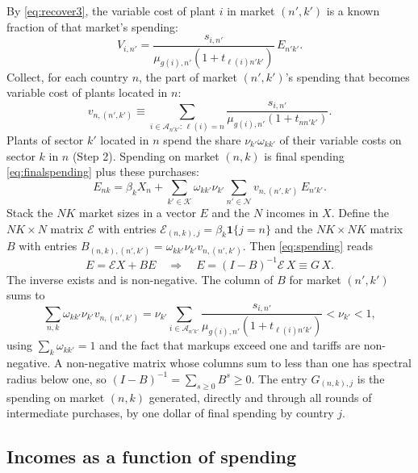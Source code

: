 \documentclass[11pt]{article}
\theoremstyle{remark}
\newcommand{\cN}{\mathcal N}
\newcommand{\cK}{\mathcal K}
\newcommand{\cA}{\mathcal A}
\begin{document}
By \eqref{eq:recover3}, the variable cost of plant $i$ in market $(n',k')$ is a known
fraction of that market's spending:
\[
  V_{i,n'}=\frac{s_{i,n'}}{\mu_{g(i),n'}(1+t_{\ell(i)n'k'})}\,E_{n'k'} .
\]
Collect, for each country $n$, the part of market $(n',k')$'s spending that becomes
variable cost of plants located in $n$:
\begin{equation}
  v_{n,(n',k')}\equiv\sum_{i\in\cA_{n'k'}:\,\ell(i)=n}
  \frac{s_{i,n'}}{\mu_{g(i),n'}(1+t_{nn'k'})} .
  \label{eq:vcoef}
\end{equation}
Plants of sector $k'$ located in $n$ spend the share $\nu_{k'}\omega_{kk'}$ of their
variable costs on sector $k$ in $n$ (Step 2). Spending on market $(n,k)$ is final
spending \eqref{eq:finalspending} plus these purchases:
\begin{equation}
  E_{nk}=\beta_kX_n+\sum_{k'\in\cK}\omega_{kk'}\nu_{k'}
  \sum_{n'\in\cN}v_{n,(n',k')}\,E_{n'k'} .
  \label{eq:spending}
\end{equation}
Stack the $NK$ market sizes in a vector $E$ and the $N$ incomes in $X$. Define the
$NK\times N$ matrix $\mathcal E$ with entries $\mathcal E_{(n,k),j}=\beta_k\mathbf
1\{j=n\}$ and the $NK\times NK$ matrix $B$ with entries
$B_{(n,k),(n',k')}=\omega_{kk'}\nu_{k'}v_{n,(n',k')}$. Then
\eqref{eq:spending} reads
\begin{equation}
  E=\mathcal EX+BE
  \quad\Longrightarrow\quad
  E=(I-B)^{-1}\mathcal E\,X\equiv G\,X .
  \label{eq:EofX}
\end{equation}
The inverse exists and is non-negative. The column of $B$ for market $(n',k')$ sums to
\[
  \sum_{n,k}\omega_{kk'}\nu_{k'}v_{n,(n',k')}
  =\nu_{k'}\sum_{i\in\cA_{n'k'}}\frac{s_{i,n'}}{\mu_{g(i),n'}(1+t_{\ell(i)n'k'})}
  <\nu_{k'}<1,
\]
using $\sum_k\omega_{kk'}=1$ and the fact that markups exceed one and tariffs are
non-negative. A non-negative matrix whose columns sum to less than one has spectral
radius below one, so $(I-B)^{-1}=\sum_{s\ge0}B^s\ge0$. The entry $G_{(n,k),j}$ is the
spending on market $(n,k)$ generated, directly and through all rounds of intermediate
purchases, by one dollar of final spending by country $j$.

\subsection{Incomes as a function of spending}
\end{document}
